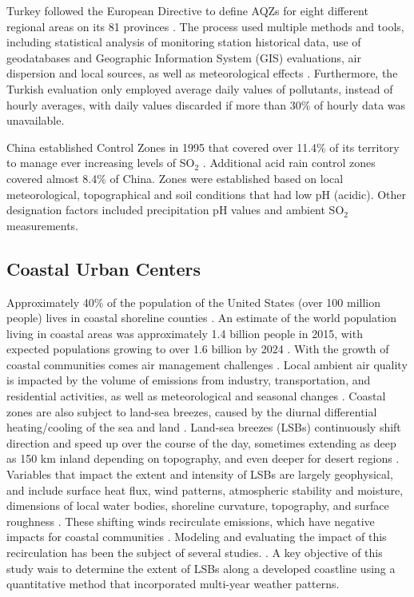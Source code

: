 Turkey followed the European Directive to define AQZs for  eight different regional areas on its 81 provinces \citep{CYGM2010}.  The process used multiple methods and tools, including statistical analysis of monitoring station historical data, use of geodatabases and Geographic Information System (GIS) evaluations, air dispersion and local sources, as well as meteorological effects \citep{Karaca2012}.  Furthermore, the Turkish evaluation only employed average daily values of pollutants, instead of hourly averages, with daily values discarded if more than 30\% of hourly data was unavailable.  

China established Control Zones in 1995 that covered over 11.4\% of its territory to manage ever increasing levels of SO$_{2}$ \citep{Hao2000}.  Additional acid rain control zones covered almost 8.4\% of China.  Zones were established based on local meteorological, topographical and soil conditions that had low pH (acidic).  Other designation factors included precipitation pH values and ambient SO$_{2}$ measurements.

\subsection{Coastal Urban Centers}

Approximately 40\% of the population of the United States (over 100 million people) lives in coastal shoreline counties \citep{NOAA2013}.  An estimate of the world population living in coastal areas was approximately 1.4 billion people in 2015, with expected populations growing  to over 1.6 billion by 2024 \citep{Geohive2015}.  With the growth of coastal communities comes air management challenges \citep{Gamas2015}.  Local ambient air quality is impacted by the volume of emissions from industry, transportation, and residential activities, as well as meteorological and seasonal changes \citep{Fiore2015, Kimbrough2013}.  Coastal zones are also subject to land-sea breezes, caused by the diurnal differential heating/cooling of the sea and land \citep{Crosman2010, Cuxart2014, Tsai2011}.  Land-sea breezes (LSBs) continuously shift direction and speed up over the course of the day, sometimes extending as deep as 150 km inland depending on topography, and even deeper for desert regions \citep{Miao2015, Zhu2004}.  Variables that impact the extent and intensity of LSBs are largely geophysical, and include surface heat flux, wind patterns, atmospheric stability and moisture, dimensions of local water bodies, shoreline curvature, topography, and surface roughness \citep{Crosman2010, Lu1995}.  These shifting winds recirculate emissions, which have negative impacts for coastal communities \citep{Lu1996}.  Modeling and evaluating the impact of this recirculation has been the subject of several studies. \citep{Crosman2010, Levy2009, Wu2013, Zhu2004}.  A key objective of this study wais to determine the extent of LSBs along a developed coastline using a quantitative method that incorporated multi-year weather patterns. 

